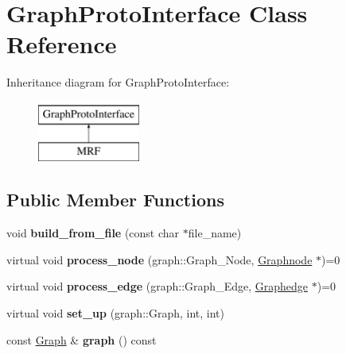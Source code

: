\hypertarget{classGraphProtoInterface}{
\section{GraphProtoInterface Class Reference}
\label{classGraphProtoInterface}
}
Inheritance diagram for GraphProtoInterface:\begin{figure}[H]
\begin{center}
\leavevmode
\includegraphics[height=2cm]{classGraphProtoInterface}
\end{center}
\end{figure}
\subsection*{Public Member Functions}
\begin{DoxyCompactItemize}
\item 
\hypertarget{classGraphProtoInterface_a4845501ec86ea627ce484cd78162c84c}{
void {\bfseries build\_\-from\_\-file} (const char $\ast$file\_\-name)}
\label{classGraphProtoInterface_a4845501ec86ea627ce484cd78162c84c}

\item 
\hypertarget{classGraphProtoInterface_a0dbd0905dbab167b9293d0ef32409af3}{
virtual void {\bfseries process\_\-node} (graph::Graph\_\-Node, \hyperlink{classScarab_1_1Graph_1_1Graphnode}{Graphnode} $\ast$)=0}
\label{classGraphProtoInterface_a0dbd0905dbab167b9293d0ef32409af3}

\item 
\hypertarget{classGraphProtoInterface_a3178c5f1eff8ed61d2512af8522cc550}{
virtual void {\bfseries process\_\-edge} (graph::Graph\_\-Edge, \hyperlink{classScarab_1_1Graph_1_1Graphedge}{Graphedge} $\ast$)=0}
\label{classGraphProtoInterface_a3178c5f1eff8ed61d2512af8522cc550}

\item 
\hypertarget{classGraphProtoInterface_a8b3125379c7b2bbf832b6b955496b76e}{
virtual void {\bfseries set\_\-up} (graph::Graph, int, int)}
\label{classGraphProtoInterface_a8b3125379c7b2bbf832b6b955496b76e}

\item 
\hypertarget{classGraphProtoInterface_a920e88785192db805206c875a8a3feed}{
const \hyperlink{classScarab_1_1Graph_1_1Graph}{Graph} \& {\bfseries graph} () const }
\label{classGraphProtoInterface_a920e88785192db805206c875a8a3feed}

\end{DoxyCompactItemize}
